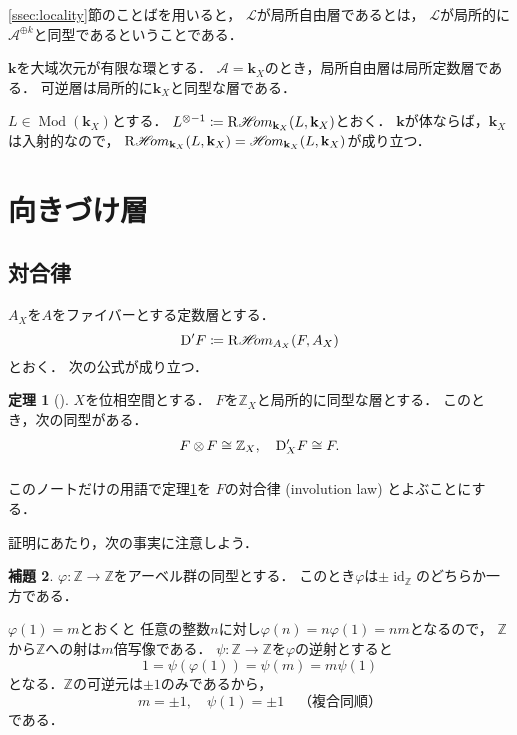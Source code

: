 \documentclass[uplatex,dvipdfmx,a4paper,10pt,draft]{jsarticle}
\makeatletter
\theoremstyle{definition}
\newcommand{\ZZ}{\mathbb{Z}}
\newcommand{\bk}{\mathbf{k}}
\newcommand{\mcal}{\mathcal}
\newcommand{\Mod}{\mathop{\mathrm{Mod}}\nolimits}
\renewenvironment{proof}[1][\proofname]{\par
  \pushQED{\qed}%
  \normalfont \topsep6\p@\@plus6\p@\relax
  \trivlist
  \item[\hskip\labelsep
         \bfseries
    {#1}]\ignorespaces
}{%
  \popQED\endtrivlist\@endpefalse
}
\renewcommand{\proofname}{証明.}
\numberwithin{equation}{section}
\newcommand{\id}{\mathop{\mathrm{id}}\nolimits}
\newcommand{\cA}{\mcal{A}}
\newcommand{\cL}{\mcal{L}}
\newcommand{\HOM}{\mathop{\mathscr{H}\hspace{-2pt}om}\nolimits}%
\newcommand{\RHOM}{\mathop{\mathrm{R}\hspace{-1.5pt}\HOM}\nolimits}
\newcommand{\rmD}{\mathrm{D}}
\newcommand{\tens}[1][]{\mathbin{\otimes_{\raise1.5ex\hbox to-.1em{}{#1}}}}
\newcommand{\ttens}[1][]{\mathbin{\mathop{\overset{\mathrm{}}{\tens}}_{#1}}}
\theoremstyle{mystyle}
\newtheorem{mythm}{定理}[section]
\newtheorem{mylmm}[mythm]{補題}
\newenvironment{thm}{\begin{thmbox}\begin{mythm}}{\end{mythm}\end{thmbox}}
\newenvironment{lmm}{\begin{lmmbox}\begin{mylmm}}{\end{mylmm}\end{lmmbox}}
\makeatother
\begin{document}
\ref{ssec:locality}節のことばを用いると，
\(\cL\)が局所自由層であるとは，
\(\cL\)が局所的に\(\cA^{\oplus k}\)と同型であるということである．

\(\bk\)を大域次元が有限な環とする．
\(\cA=\bk_X\)のとき，局所自由層は局所定数層である．
可逆層は局所的に\(\bk_X\)と同型な層である．

\(L\in\Mod(\bk_X)\)とする．
\(L^{\otimes -1}\coloneqq\RHOM_{\bk_X}(L,\bk_X)\)とおく．
\(\bk\)が体ならば，\(\bk_X\)は入射的なので，
\(\RHOM_{\bk_X}(L,\bk_X)=\HOM_{\bk_X}(L,\bk_X)\)が成り立つ．

\section{向きづけ層}

\subsection{対合律}

\(A_X\)を\(A\)をファイバーとする定数層とする．
\[
    \rmD'F\coloneqq \RHOM_{A_X}(F,A_X)
\]
とおく．
次の公式が成り立つ．

\begin{thm}[{\cite[演習III.3]{KS90}}]\label{thm:ori-dual}
    \(X\)を位相空間とする．
    \(F\)を\(\ZZ_X\)と局所的に同型な層とする．
    このとき，次の同型がある．\[
        F\ttens[]F\cong \ZZ_X,
        \quad
        \rmD'_{X} F\cong F.
    \]
\end{thm}
このノートだけの用語で定理\ref{thm:ori-dual}を
\(F\)の対合律 (involution law) とよぶことにする．

証明にあたり，次の事実に注意しよう．
\begin{lmm}\label{lmm:pm1}
    \(\varphi\colon\ZZ\to\ZZ\)をアーベル群の同型とする．
    このとき\(\varphi\)は\(\pm\id_{\ZZ}\)のどちらか一方である．
\end{lmm}

\begin{proof}
    \(\varphi(1)=m\)とおくと
    任意の整数\(n\)に対し\(\varphi(n)=n\varphi(1)=nm\)となるので，
    \(\ZZ\)から\(\ZZ\)への射は\(m\)倍写像である．
    \(\psi\colon\ZZ\to\ZZ\)を\(\varphi\)の逆射とすると
    \[
        1=\psi(\varphi(1))=\psi(m)=m\psi(1)
    \]
    となる．\(\ZZ\)の可逆元は\(\pm1\)のみであるから，
    \[
        m=\pm1,
        \quad
        \psi(1)=\pm1
        \quad
        \text{（複合同順）}
    \]
    である．
\end{proof}
\end{document}
